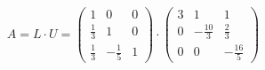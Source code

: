 \documentclass[preview]{standalone}
\begin{document}
\begin{align*}
A =  L \cdot U  =  \begin{pmatrix}1 & 0 & 0\\\frac{1}{3} & 1 & 0\\\frac{1}{3} & -\frac{1}{5} & 1\end{pmatrix} \cdot \begin{pmatrix}3 & 1 & 1\\0 & -\frac{10}{3} & \frac{2}{3}\\0 & 0 & -\frac{16}{5}\end{pmatrix}
\end{align*}
\end{document}

